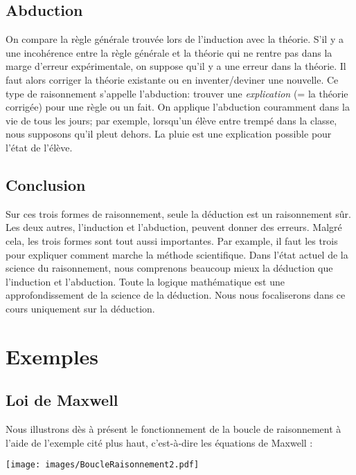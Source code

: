 \subsection{Abduction}

On compare la règle générale trouvée lors de l'induction avec la théorie.
S'il y a une incohérence entre la règle générale et la théorie qui ne rentre pas dans la marge d'erreur expérimentale, on suppose qu'il y a une erreur dans la théorie.
Il faut alors corriger la théorie existante ou en inventer/deviner une nouvelle. 
Ce type de raisonnement s'appelle l'abduction:
trouver une {\em explication} (= la théorie corrigée) pour une règle ou un fait.
On applique l'abduction couramment dans la vie de tous les jours; par exemple, lorsqu'un élève entre trempé dans la classe, nous supposons qu'il pleut dehors.
La pluie est une explication possible pour l'état de l'élève. \\

\subsection{Conclusion}

Sur ces trois formes de raisonnement, seule la déduction est un raisonnement sûr.
Les deux autres, l'induction et l'abduction, peuvent donner des erreurs.
Malgré cela, les trois formes sont tout aussi importantes.
Par example, il faut les trois pour expliquer comment marche la méthode scientifique.
Dans l'état actuel de la science du raisonnement,
nous comprenons beaucoup mieux la déduction que l'induction et l'abduction.
Toute la logique mathématique est une approfondissement de la science de la déduction.
Nous nous focaliserons dans ce cours uniquement sur la déduction. \\

\section{Exemples}

\subsection{Loi de Maxwell}

Nous illustrons dès à présent le fonctionnement de la boucle de raisonnement à l'aide de l'exemple cité plus haut, c'est-à-dire les équations de Maxwell :

\begin{center}
\texttt{[image: images/BoucleRaisonnement2.pdf]}
\end{center}

